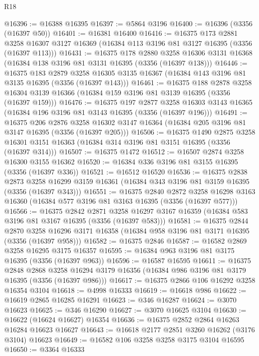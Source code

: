 \begin{lexlean}{R18}
\begin{coremodule}
@16396 := @16388 @16395
@16397 := @5864 @3196
@16400 := @16396 (@3356 (@16397 @50))
@16401 := @16381 @16400
@16416 := @16375
    @173
    @2881
    @3258
    @16307
    @3127
    @16369
    (@16384 @113 @3196 @81 @3127 @16395 (@3356 (@16397 @113)))
@16431 := @16375
    @178
    @2880
    @3258
    @16306
    @3131
    @16368
    (@16384 @138 @3196 @81 @3131 @16395 (@3356 (@16397 @138)))
@16446 := @16375
    @183
    @2879
    @3258
    @16305
    @3135
    @16367
    (@16384 @143 @3196 @81 @3135 @16395 (@3356 (@16397 @143)))
@16461 := @16375
    @188
    @2878
    @3258
    @16304
    @3139
    @16366
    (@16384 @159 @3196 @81 @3139 @16395 (@3356 (@16397 @159)))
@16476 := @16375
    @197
    @2877
    @3258
    @16303
    @3143
    @16365
    (@16384 @196 @3196 @81 @3143 @16395 (@3356 (@16397 @196)))
@16491 := @16375
    @206
    @2876
    @3258
    @16302
    @3147
    @16364
    (@16384 @205 @3196 @81 @3147 @16395 (@3356 (@16397 @205)))
@16506 := @16375
    @1490
    @2875
    @3258
    @16301
    @3151
    @16363
    (@16384 @314 @3196 @81 @3151 @16395 (@3356 (@16397 @314)))
@16507 := @16375 @1472
@16512 := @16507 @2874 @3258 @16300 @3155 @16362
@16520 := @16384 @336 @3196 @81 @3155 @16395 (@3356 (@16397 @336))
@16521 := @16512 @16520
@16536 := @16375
    @2838
    @2873
    @3258
    @16299
    @3159
    @16361
    (@16384 @343 @3196 @81 @3159 @16395 (@3356 (@16397 @343)))
@16551 := @16375
    @2840
    @2872
    @3258
    @16298
    @3163
    @16360
    (@16384 @577 @3196 @81 @3163 @16395 (@3356 (@16397 @577)))
@16566 := @16375
    @2842
    @2871
    @3258
    @16297
    @3167
    @16359
    (@16384 @583 @3196 @81 @3167 @16395 (@3356 (@16397 @583)))
@16581 := @16375
    @2844
    @2870
    @3258
    @16296
    @3171
    @16358
    (@16384 @958 @3196 @81 @3171 @16395 (@3356 (@16397 @958)))
@16582 := @16375 @2846
@16587 := @16582 @2869 @3258 @16295 @3175 @16357
@16595 := @16384 @963 @3196 @81 @3175 @16395 (@3356 (@16397 @963))
@16596 := @16587 @16595
@16611 := @16375
    @2848
    @2868
    @3258
    @16294
    @3179
    @16356
    (@16384 @986 @3196 @81 @3179 @16395 (@3356 (@16397 @986)))
@16617 := @16375 @2866 @106 @16292 @3258 @16354 @3104
@16618 := @4998 @16333
@16619 := @16618 @986
@16622 := @16619 @2865 @16285 @16291
@16623 := @346 @16287
@16624 := @3070 @16623
@16625 := @346 @16290
@16627 := @3070 @16625 @3104
@16630 := @16622 (@16624 @16627) @16354
@16636 := @16375 @2852 @2864 @16263 @16284 @16623 @16627
@16643 := @16618 @2177 @2851 @3260 @16262 (@3176 @3104) @16623
@16649 := @16582 @106 @3258 @3258 @3175 @3104 @16595
@16650 := @3364 @16333

\end{coremodule}
\end{lexlean}
